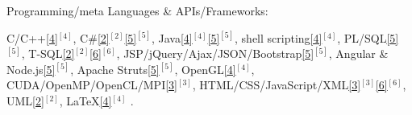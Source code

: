 \begin{cventries}

  \cventry
    {Programming/meta Languages \& APIs/Frameworks:} %
    {} %
    {} %
    {} %
    {     
      \begin{cvitems} %
        \item {
        C/C++\ref{4}{$^{[4]}$}, 
        C\#\ref{2}{$^{[2]}$}\ref{5}{$^{[5]}$}, 
        Java\ref{4}{$^{[4]}$}\ref{5}{$^{[5]}$}, 
        shell scripting\ref{4}{$^{[4]}$}, 
        PL/SQL\ref{5}{$^{[5]}$}, 
        T-SQL\ref{2}{$^{[2]}$}\ref{6}{$^{[6]}$},  
        JSP/jQuery/Ajax/JSON/Bootstrap\ref{5}{$^{[5]}$},          
        Angular %
        \& Node.js\ref{5}{$^{[5]}$},
        Apache Struts\ref{5}{$^{[5]}$},
        OpenGL\ref{4}{$^{[4]}$},      
        CUDA/OpenMP/OpenCL/MPI\ref{3}{$^{[3]}$},
        HTML/CSS/JavaScript/XML\ref{3}{$^{[3]}$}\ref{6}{$^{[6]}$}, 
        UML\ref{2}{$^{[2]}$},
        LaTeX\ref{4}{$^{[4]}$}%
		.}
	  \end{cvitems}
    }  
  \vspace{-0.4cm}


\end{cventries}
